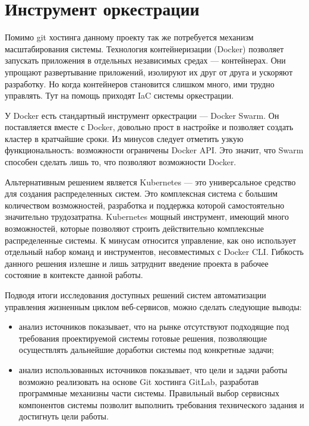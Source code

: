 \section{Инструмент оркестрации}

Помимо git хостинга данному проекту так же потребуется механизм масштабирования системы.
Технология контейнеризации (Docker) позволяет запускать приложения в отдельных независимых средах --- контейнерах.
Они упрощают развертывание приложений, изолируют их друг от друга и ускоряют разработку.
Но когда контейнеров становится слишком много, ими трудно управлять.
Тут на помощь приходят IaC системы оркестрации.

У Docker есть стандартный инструмент оркестрации --- Docker Swarm.
Он поставляется вместе с Docker, довольно прост в настройке и позволяет создать кластер в кратчайшие сроки.
Из минусов следует отметить узкую функциональность: возможности ограничены Docker API.
Это значит, что Swarm способен сделать лишь то, что позволяют возможности Docker.

Альтернативным решением является Kubernetes --- это универсальное средство для создания распределенных систем.
Это комплексная система с большим количеством возможностей, разработка и поддержка которой самостоятельно значительно трудозатратна.
Kubernetes мощный инструмент, имеющий много возможностей, которые позволяют строить действительно комплексные распределенные системы.
К минусам относится управление, как оно использует отдельный набор команд и инструментов, несовместимых с Docker CLI.
Гибкость данного решения излешне и лишь затруднит введение проекта в рабочее состояние в контексте данной работы.

Подводя итоги исследования доступных решений систем автоматизации управления жизненным циклом веб-сервисов, можно сделать следующие выводы:
\begin{itemize}
    \item анализ источников показывает, что на рынке отсутствуют подходящие под требования проектируемой системы готовые решения,
    позволяющие осуществлять дальнейшие доработки системы под конкретные задачи;
    \item анализ использованных источников показывает, что цели и задачи работы возможно реализовать на основе Git хостинга GitLab,
    разработав программные механизны части системы.
    Правильный выбор сервисных компонентов системы позволит выполнить требования технического задания и достигнуть цели работы.
\end{itemize}

\cite{vkrsen}
\cite{linuxPocket}
\cite{devOpsPhy}
\cite{likeGoogle}
\cite{kuberForDevOps}
\cite{fasterDevOps}
\cite{cd}
\cite{ciCd}
\cite{web:docker:docs}
\cite{web:gitlab:docs}
\cite{web:docker:swarm}
\cite{web:npm:docs}
\cite{web:github:docs}
\cite{web:space:docs}
\cite{web:git:book}
\cite{web:bitbucket}
\cite{web:git-reps:rating}
\cite{web:gitlab}
\cite{web:docker-kubernetes}


